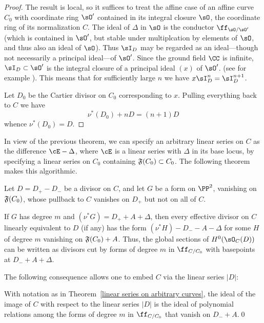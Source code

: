 \begin{proof}
The result is local, so it suffices to treat the affine case of an affine curve $C_{0}$ with coordinate
ring $\sO'$ contained
in its integral closure $\sO$, the coordinate ring of its normalization $C$.
The ideal of $\Delta$ in $\sO$ is the conductor $\ff_{\sO/{\sO'}}$ (which is contained in $\sO'$, but stable under
multiplcation by elements of $\sO$, and thus also an ideal of $\sO$). 
Thus $\sI_{D}$ may be regarded as an ideal---though not necessarily a principal ideal---of $\sO'$. Since the  ground field $\CC$ is infinite, $\sI_{D}\subset \sO'$ is the integral closure of a principal ideal $(x)$
of $\sO'$.
(see for example \cite[Chapter 8]{Swanson-Huneke}).
This means that for sufficiently large $n$ we have $x\sI_{D}^{n} = \sI_{D}^{n+1}$.

Let $D_{0}$ be the Cartier divisor on $C_{0}$ corresponding to $x$. Pulling everything back to $C$
we have 
$$
\nu^*(D_{0})+nD = (n+1)D
$$
whence $\nu^*(D_{0}) = D$.
 \end{proof}

In view of the previous theorem, we can specify an arbitrary linear series on $C$
as the difference $\cE - \Delta$, where $\cE$ is a linear series with $\Delta$ in its base locus, by specifying a
linear series on $C_0$ containing  $\adj(C_{0})\subset C_{0}$. The following theorem makes
this algorithmic.

\begin{theorem}\label{linear series on arbitrary curves}
Let $D = D_{+}-D_{-}$ be a divisor on $C$, and let $G$ be a form on $\PP^{2}$,
vanishing on $\adj(C_{0})$, whose pullback to $C$
vanishes on $D_{+}$ but not on all of $C$. 

If $G$ has degree $m$ and $(\nu^{*}G) = D_{+}+A+\Delta$, then every effective divisor on
$C$ linearly equivalent to $D$ (if any) has the form $(\nu^*H)-D_{-}-A-\Delta$ for some $H$ of degree $m$
 vanishing on $\adj(C_{0})+A$. Thus, the global sections of $H^{0}(\sO_{C}(D))$ can be written
as divisors cut by forms of degree $m$ in $\ff_{C/C_{0}}$ with basepoints at $D_{-}+A+\Delta$.
\end{theorem}

The following consequence allows one to embed $C$ via the linear series $|D|$:

\begin{corollary}
With notation as in Theorem~\ref{linear series on arbitrary curves}, the ideal of the image of
$C$ with respect to the linear series $|D|$ is the ideal of polynomial relations among the forms
of degree $m$ in $\ff_{C/C_{0}}$ that vanish on $D_{-}+A$.\qed
\end{corollary}

